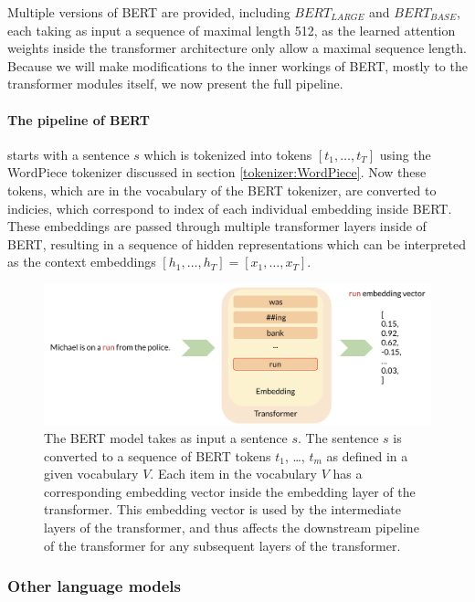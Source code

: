 \documentclass[a4paper,12pt,twoside,openright]{report}
\begin{document}
Multiple versions of BERT are provided, including $BERT_{LARGE}$ and $BERT_{BASE}$, each taking as input a sequence of maximal length 512, as the learned attention weights inside the transformer architecture only allow a maximal sequence length. 
Because we will make modifications to the inner workings of BERT, mostly to the transformer modules itself, we now present the full pipeline. 

\paragraph{The pipeline of BERT} starts with a sentence $s$ which is tokenized into tokens $[t_1, \ldots, t_T]$ using the WordPiece tokenizer discussed in section \ref{tokenizer:WordPiece}.
Now these tokens, which are in the vocabulary of the BERT tokenizer, are converted to indicies, which correspond to index of each individual embedding inside BERT.
These embeddings are passed through multiple transformer layers inside of BERT, resulting in a sequence of hidden representations which can be interpreted as the context embeddings $[h_1, \ldots, h_T] = [x_1, \ldots, x_T]$.

\begin{figure}[h]
	\center
  \includegraphics[width=\linewidth]{./assets/experiments/pipeline_vanilla_BERT.png}
  \caption{The BERT model takes as input a sentence $s$. The sentence $s$ is converted to a sequence of BERT tokens $t_1$, \ldots, $t_m$ as defined in a given vocabulary $V$.
Each item in the vocabulary $V$ has a corresponding embedding vector inside the embedding layer of the transformer.
This embedding vector is used by the intermediate layers of the transformer, and thus affects the downstream pipeline of the transformer for any subsequent layers of the transformer.
}
  \label{fig:BERT_vanilla_pipeline}
\end{figure}

\subsubsection{Other language models}
\end{document}
